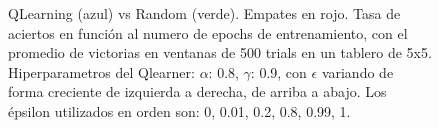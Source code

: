 \documentclass[10pt,a4paper]{article}
\begin{document}
\begin{figure}[H]
\end{figure}

\begin{figure}[H]
\caption{QLearning (azul) vs Random (verde). Empates en rojo. Tasa de aciertos en función al numero de epochs de entrenamiento, con el promedio de victorias en ventanas de 500 trials en un tablero de 5x5. Hiperparametros del Qlearner: $\alpha$: 0.8, $\gamma$: 0.9, con $\epsilon$ variando de forma creciente de izquierda a derecha, de arriba a abajo. Los épsilon utilizados en orden son: 0, 0.01, 0.2, 0.8, 0.99, 1.}
\end{figure}
\end{document}
